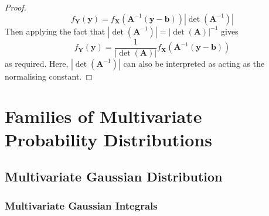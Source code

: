 \documentclass[11pt]{report} %
\begin{document}
\begin{proof}
\begin{equation}
f_{\mathbf{Y}}\left(\mathbf{y}\right) = f_{\mathbf{X}}\left(\mathbf{A}^{-1}\left(\mathbf{y} - \mathbf{b}\right)\right)\left|\operatorname{det}\left(\mathbf{A}^{-1}\right)\right|
\end{equation}
Then applying the fact that $\left|\operatorname{det}\left(\mathbf{A}^{-1}\right)\right| = \left|\operatorname{det}\left(\mathbf{A}\right)\right|^{-1}$ gives
\begin{equation}
f_{\mathbf{Y}}\left(\mathbf{y}\right) = \dfrac{1}{\left|\operatorname{det}\left(\mathbf{A}\right)\right|}f_{\mathbf{X}}\left(\mathbf{A}^{-1}\left(\mathbf{y} - \mathbf{b}\right)\right)
\end{equation}
as required. Here, $\left|\operatorname{det}\left(\mathbf{A}^{-1}\right)\right|$ can also be interpreted as acting as the normalising constant.
\end{proof}


\section{Families of Multivariate Probability Distributions}

\subsection{Multivariate Gaussian Distribution}

\subsubsection{Multivariate Gaussian Integrals}
\end{document}
